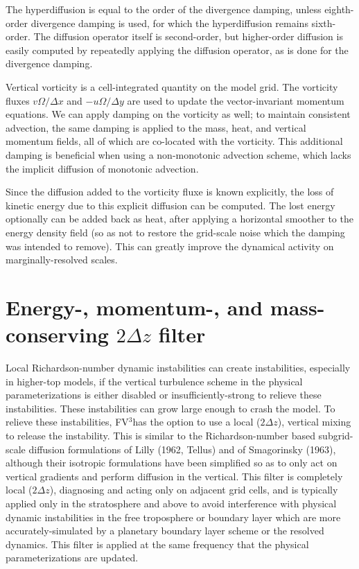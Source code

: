 \documentclass[12pt,letterpaper]{book}
\newcommand{\fv}{FV$^{\mathrm{3}}$}
\begin{document}
The hyperdiffusion is equal to the order of the divergence damping, unless eighth-order divergence damping is used, for which the hyperdiffusion remains sixth-order. The diffusion operator itself is second-order, but higher-order diffusion is easily computed by repeatedly applying the diffusion operator, as is done for the divergence damping.

Vertical vorticity is a cell-integrated quantity on the model grid. The vorticity fluxes $v \Omega/\Delta x$  and $-u \Omega / \Delta y$ are used to update the vector-invariant momentum equations. We can apply damping on the vorticity as well; to maintain consistent advection, the same damping is applied to the mass, heat, and vertical momentum fields, all of which are co-located with the vorticity. This additional damping is beneficial when using a non-monotonic advection scheme, which lacks the implicit diffusion of monotonic advection.


Since the diffusion added to the vorticity fluxe is known explicitly, the loss of kinetic energy due to this explicit diffusion can be computed. The lost energy optionally can be added back as heat, after applying a horizontal smoother to the energy density field (so as not to restore the grid-scale noise which the damping was intended to remove). This can greatly improve the dynamical activity on marginally-resolved scales.

\section{Energy-, momentum-, and mass-conserving $2\Delta z$ filter}

Local Richardson-number dynamic instabilities can create instabilities, especially in higher-top models, if the vertical turbulence scheme in the physical parameterizations is either disabled or insufficiently-strong to relieve these instabilities. These instabilities can grow large enough to crash the model. To relieve these instabilities, \fv has the option to use a local ($2\Delta z$), vertical mixing to release the instability. This is similar to the Richardson-number based subgrid-scale diffusion formulations of Lilly (1962, Tellus) and of Smagorinsky (1963), although their isotropic formulations have been simplified so as to only act on vertical gradients and perform diffusion in the vertical. This filter is completely local ($2\Delta z$), diagnosing and acting only on adjacent grid cells, and is typically applied only in the stratosphere and above to avoid interference with physical dynamic instabilities in the free troposphere or boundary layer which are more accurately-simulated by a planetary boundary layer scheme or the resolved dynamics. This filter is applied at the same frequency that the physical parameterizations are updated.
\end{document}
